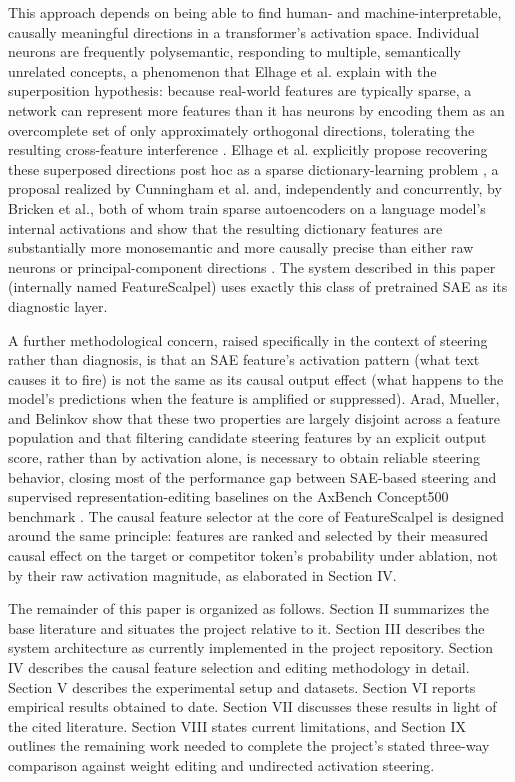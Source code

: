 \documentclass[conference]{IEEEtran}
\begin{document}
This approach depends on being able to find human- and machine-interpretable, causally meaningful directions in a transformer's activation space. Individual neurons are frequently polysemantic, responding to multiple, semantically unrelated concepts, a phenomenon that Elhage et al. explain with the superposition hypothesis: because real-world features are typically sparse, a network can represent more features than it has neurons by encoding them as an overcomplete set of only approximately orthogonal directions, tolerating the resulting cross-feature interference \cite{elhage2022superposition}. Elhage et al. explicitly propose recovering these superposed directions post hoc as a sparse dictionary-learning problem \cite{elhage2022superposition}, a proposal realized by Cunningham et al. and, independently and concurrently, by Bricken et al., both of whom train sparse autoencoders on a language model's internal activations and show that the resulting dictionary features are substantially more monosemantic and more causally precise than either raw neurons or principal-component directions \cite{cunningham2023sparse, bricken2023towards}. The system described in this paper (internally named FeatureScalpel) uses exactly this class of pretrained SAE as its diagnostic layer.

A further methodological concern, raised specifically in the context of steering rather than diagnosis, is that an SAE feature's activation pattern (what text causes it to fire) is not the same as its causal output effect (what happens to the model's predictions when the feature is amplified or suppressed). Arad, Mueller, and Belinkov show that these two properties are largely disjoint across a feature population and that filtering candidate steering features by an explicit output score, rather than by activation alone, is necessary to obtain reliable steering behavior, closing most of the performance gap between SAE-based steering and supervised representation-editing baselines on the AxBench Concept500 benchmark \cite{arad2025steering}. The causal feature selector at the core of FeatureScalpel is designed around the same principle: features are ranked and selected by their measured causal effect on the target or competitor token's probability under ablation, not by their raw activation magnitude, as elaborated in Section IV.

The remainder of this paper is organized as follows. Section II summarizes the base literature and situates the project relative to it. Section III describes the system architecture as currently implemented in the project repository. Section IV describes the causal feature selection and editing methodology in detail. Section V describes the experimental setup and datasets. Section VI reports empirical results obtained to date. Section VII discusses these results in light of the cited literature. Section VIII states current limitations, and Section IX outlines the remaining work needed to complete the project's stated three-way comparison against weight editing and undirected activation steering.
\end{document}
